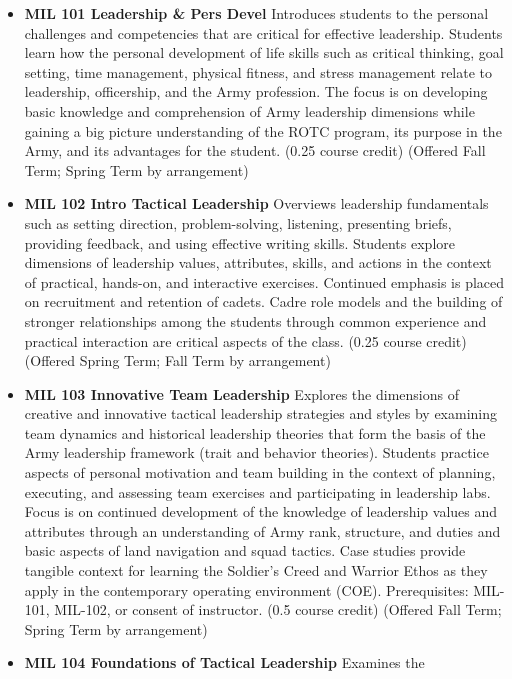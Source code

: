 \documentclass[
  letterpaper,
]{scrbook}
\providecommand{\tightlist}{%
  \setlength{\itemsep}{0pt}\setlength{\parskip}{0pt}}
\begin{document}
\begin{itemize}
\tightlist
\item
  \textbf{MIL 101 Leadership \& Pers Devel} Introduces students to the
  personal challenges and competencies that are critical for effective
  leadership. Students learn how the personal development of life skills
  such as critical thinking, goal setting, time management, physical
  fitness, and stress management relate to leadership, officership, and
  the Army profession. The focus is on developing basic knowledge and
  comprehension of Army leadership dimensions while gaining a big
  picture understanding of the ROTC program, its purpose in the Army,
  and its advantages for the student. (0.25 course credit) (Offered Fall
  Term; Spring Term by arrangement)
\item
  \textbf{MIL 102 Intro Tactical Leadership} Overviews leadership
  fundamentals such as setting direction, problem-solving, listening,
  presenting briefs, providing feedback, and using effective writing
  skills. Students explore dimensions of leadership values, attributes,
  skills, and actions in the context of practical, hands-on, and
  interactive exercises. Continued emphasis is placed on recruitment and
  retention of cadets. Cadre role models and the building of stronger
  relationships among the students through common experience and
  practical interaction are critical aspects of the class. (0.25 course
  credit) (Offered Spring Term; Fall Term by arrangement)
\item
  \textbf{MIL 103 Innovative Team Leadership} Explores the dimensions of
  creative and innovative tactical leadership strategies and styles by
  examining team dynamics and historical leadership theories that form
  the basis of the Army leadership framework (trait and behavior
  theories). Students practice aspects of personal motivation and team
  building in the context of planning, executing, and assessing team
  exercises and participating in leadership labs. Focus is on continued
  development of the knowledge of leadership values and attributes
  through an understanding of Army rank, structure, and duties and basic
  aspects of land navigation and squad tactics. Case studies provide
  tangible context for learning the Soldier's Creed and Warrior Ethos as
  they apply in the contemporary operating environment (COE).
  Prerequisites: MIL-101, MIL-102, or consent of instructor. (0.5 course
  credit) (Offered Fall Term; Spring Term by arrangement)
\item
  \textbf{MIL 104 Foundations of Tactical Leadership} Examines the

\end{itemize}
\end{document}
